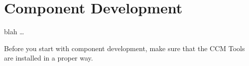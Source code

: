 \chapter{Component Development}

blah \dots

Before you start with component development, make sure that the CCM Tools are
installed in a proper way.


\newpage

\newpage

\newpage


\newpage


\newpage
